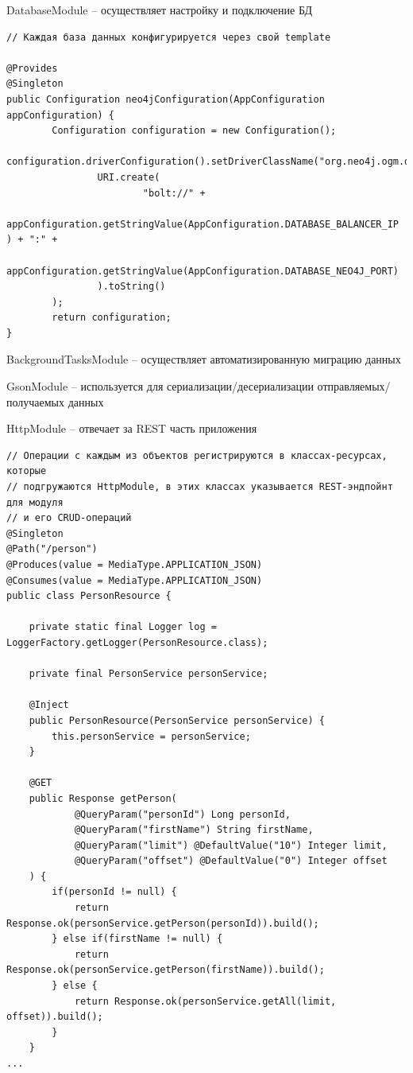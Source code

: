 DatabaseModule -- осуществляет настройку и подключение БД
\begin{Verbatim}[fontsize=\scriptsize]
// Каждая база данных конфигурируется через свой template

@Provides
@Singleton
public Configuration neo4jConfiguration(AppConfiguration appConfiguration) {
        Configuration configuration = new Configuration();
        configuration.driverConfiguration().setDriverClassName("org.neo4j.ogm.drivers.bolt.driver.BoltDriver").setURI(
                URI.create(
                        "bolt://" +
                        appConfiguration.getStringValue(AppConfiguration.DATABASE_BALANCER_IP ) + ":" +
                        appConfiguration.getStringValue(AppConfiguration.DATABASE_NEO4J_PORT)
                ).toString()
        );
        return configuration;
}

\end{Verbatim}
BackgroundTasksModule -- осуществляет автоматизированную миграцию данных

GsonModule -- используется для сериализации/десериализации отправляемых/получаемых данных

HttpModule -- отвечает за REST часть приложения
\begin{Verbatim}[fontsize=\scriptsize]
// Операции с каждым из объектов регистрируются в классах-ресурсах, которые
// подгружаются HttpModule, в этих классах указывается REST-эндпойнт для модуля
// и eго CRUD-операций
@Singleton
@Path("/person")
@Produces(value = MediaType.APPLICATION_JSON)
@Consumes(value = MediaType.APPLICATION_JSON)
public class PersonResource {

    private static final Logger log = LoggerFactory.getLogger(PersonResource.class);

    private final PersonService personService;

    @Inject
    public PersonResource(PersonService personService) {
        this.personService = personService;
    }

    @GET
    public Response getPerson(
            @QueryParam("personId") Long personId,
            @QueryParam("firstName") String firstName,
            @QueryParam("limit") @DefaultValue("10") Integer limit,
            @QueryParam("offset") @DefaultValue("0") Integer offset
    ) {
        if(personId != null) {
            return Response.ok(personService.getPerson(personId)).build();
        } else if(firstName != null) {
            return Response.ok(personService.getPerson(firstName)).build();
        } else {
            return Response.ok(personService.getAll(limit, offset)).build();
        }
    }
...
\end{Verbatim}


